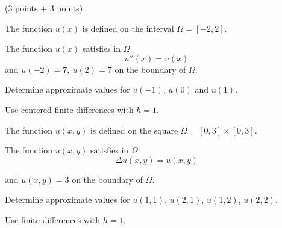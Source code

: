 (3 points + 3 points)
\begin{teilaufgaben}
\item
The function $u(x)$ is defined on the interval $\Omega = [-2,2].$ 

The function $u(x)$ satisfies in $\Omega$ 
\[
u''(x) = u(x)
\]
and  $u(-2) = 7, \ u(2) = 7$ on the boundary of $\Omega$. 

Determine approximate values for $u(-1)$, $u(0)$ and $u(1)$. 

Use centered finite differences with $h = 1$. 

\item
The function $u(x,y)$ is defined on the square $\Omega = [0, 3] \times [0,3]$.

The function $u(x,y)$ satisfies in $\Omega$
\[
\Delta u(x,y) = u(x,y)
\]

and $u(x,y) = 3$ on the boundary of $\Omega$.

Determine approximate values for $u(1,1)$, $u(2,1)$, $u(1,2)$, $u(2,2)$.

Use finite differences with $h = 1.$

\end{teilaufgaben}

